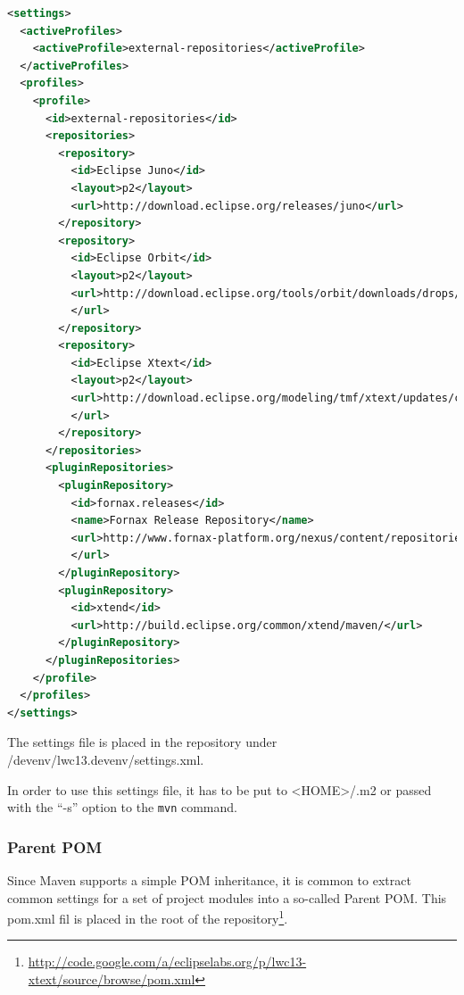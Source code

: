 \begin{lstlisting}[language=XML]
<settings>
  <activeProfiles>
    <activeProfile>external-repositories</activeProfile>
  </activeProfiles>
  <profiles>
    <profile>
      <id>external-repositories</id>
      <repositories>
        <repository>
          <id>Eclipse Juno</id>
          <layout>p2</layout>
          <url>http://download.eclipse.org/releases/juno</url>
        </repository>
        <repository>
          <id>Eclipse Orbit</id>
          <layout>p2</layout>
          <url>http://download.eclipse.org/tools/orbit/downloads/drops/R20120526062928/repository/
          </url>
        </repository>
        <repository>
          <id>Eclipse Xtext</id>
          <layout>p2</layout>
          <url>http://download.eclipse.org/modeling/tmf/xtext/updates/composite/releases/
          </url>
        </repository>
      </repositories>
      <pluginRepositories>
        <pluginRepository>
          <id>fornax.releases</id>
          <name>Fornax Release Repository</name>
          <url>http://www.fornax-platform.org/nexus/content/repositories/releases/
          </url>
        </pluginRepository>
        <pluginRepository>
          <id>xtend</id>
          <url>http://build.eclipse.org/common/xtend/maven/</url>
        </pluginRepository>
      </pluginRepositories>
    </profile>
  </profiles>
</settings>
\end{lstlisting}

The settings file is placed in the repository under
/devenv/lwc13.devenv/settings.xml.

In order to use this settings file, it has to be put to <HOME>/.m2 or passed
with the ``-s'' option to the \texttt{mvn} command.

\subsubsection{Parent POM}
Since Maven supports a simple POM inheritance, it is common to extract common
settings for a set of project modules into a so-called Parent POM. This pom.xml
fil is placed in the root of the
repository\footnote{\url{http://code.google.com/a/eclipselabs.org/p/lwc13-xtext/source/browse/pom.xml}}.

